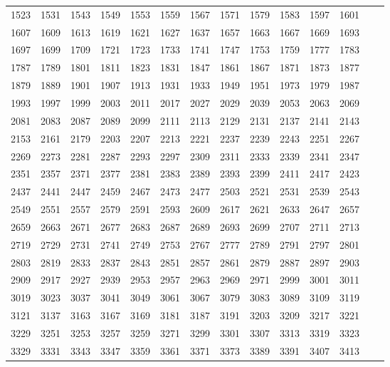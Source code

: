\documentclass[10pt, a4paper]{article}
\begin{document}
\begin{center}
\begin{longtable}{c c c c c c c c c c c c c c}
        1523 & 1531 & 1543 & 1549 & 1553 & 1559 & 1567 & 1571 & 1579 & 1583 & 1597 & 1601 \\
        1607 & 1609 & 1613 & 1619 & 1621 & 1627 & 1637 & 1657 & 1663 & 1667 & 1669 & 1693 \\
        1697 & 1699 & 1709 & 1721 & 1723 & 1733 & 1741 & 1747 & 1753 & 1759 & 1777 & 1783 \\
        1787 & 1789 & 1801 & 1811 & 1823 & 1831 & 1847 & 1861 & 1867 & 1871 & 1873 & 1877 \\
        1879 & 1889 & 1901 & 1907 & 1913 & 1931 & 1933 & 1949 & 1951 & 1973 & 1979 & 1987 \\
        1993 & 1997 & 1999 & 2003 & 2011 & 2017 & 2027 & 2029 & 2039 & 2053 & 2063 & 2069 \\
        2081 & 2083 & 2087 & 2089 & 2099 & 2111 & 2113 & 2129 & 2131 & 2137 & 2141 & 2143 \\
        2153 & 2161 & 2179 & 2203 & 2207 & 2213 & 2221 & 2237 & 2239 & 2243 & 2251 & 2267 \\
        2269 & 2273 & 2281 & 2287 & 2293 & 2297 & 2309 & 2311 & 2333 & 2339 & 2341 & 2347 \\
        2351 & 2357 & 2371 & 2377 & 2381 & 2383 & 2389 & 2393 & 2399 & 2411 & 2417 & 2423 \\
        2437 & 2441 & 2447 & 2459 & 2467 & 2473 & 2477 & 2503 & 2521 & 2531 & 2539 & 2543 \\
        2549 & 2551 & 2557 & 2579 & 2591 & 2593 & 2609 & 2617 & 2621 & 2633 & 2647 & 2657 \\
        2659 & 2663 & 2671 & 2677 & 2683 & 2687 & 2689 & 2693 & 2699 & 2707 & 2711 & 2713 \\
        2719 & 2729 & 2731 & 2741 & 2749 & 2753 & 2767 & 2777 & 2789 & 2791 & 2797 & 2801 \\
        2803 & 2819 & 2833 & 2837 & 2843 & 2851 & 2857 & 2861 & 2879 & 2887 & 2897 & 2903 \\
        2909 & 2917 & 2927 & 2939 & 2953 & 2957 & 2963 & 2969 & 2971 & 2999 & 3001 & 3011 \\
        3019 & 3023 & 3037 & 3041 & 3049 & 3061 & 3067 & 3079 & 3083 & 3089 & 3109 & 3119 \\
        3121 & 3137 & 3163 & 3167 & 3169 & 3181 & 3187 & 3191 & 3203 & 3209 & 3217 & 3221 \\
        3229 & 3251 & 3253 & 3257 & 3259 & 3271 & 3299 & 3301 & 3307 & 3313 & 3319 & 3323 \\
        3329 & 3331 & 3343 & 3347 & 3359 & 3361 & 3371 & 3373 & 3389 & 3391 & 3407 & 3413 \\

\end{longtable}
\end{center}
\end{document}

